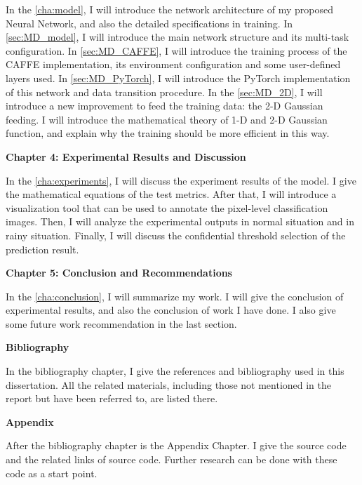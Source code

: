 \begin{spacing}{1.5}
In the \autoref{cha:model}, I will introduce the network architecture of my proposed Neural Network, and also the detailed specifications in training. In \autoref{sec:MD_model}, I will introduce the main network structure and its multi-task configuration. In \autoref{sec:MD_CAFFE}, I will introduce the training process of the CAFFE implementation, its environment configuration and some user-defined layers used. In \autoref{sec:MD_PyTorch}, I will introduce the PyTorch implementation of this network and data transition procedure. In the \autoref{sec:MD_2D}, I will introduce a new improvement to feed the training data: the 2-D Gaussian feeding. I will introduce the mathematical theory of 1-D and 2-D Gaussian function, and explain why the training should be more  efficient in this way.

{\large\textbf{Chapter 4: Experimental Results and Discussion}}

In the \autoref{cha:experiments}, I will discuss the experiment results of the model. I give the mathematical equations of the test metrics. After that, I will introduce a visualization tool that can be used to annotate the pixel-level classification images. Then, I will analyze the experimental outputs in normal situation and in rainy situation. Finally, I will discuss the confidential threshold selection of the prediction result.

{\large\textbf{Chapter 5: Conclusion and Recommendations}}

In the \autoref{cha:conclusion}, I will summarize my work. I will give the conclusion of experimental results, and also the conclusion of work I have done. I also give some future work recommendation in the last section.

{\large\textbf{Bibliography}}

In the bibliography chapter, I give the references and bibliography used in this dissertation. All the related materials, including those not mentioned in the report but have been referred to, are listed there.

{\large\textbf{Appendix}}

After the bibliography chapter is the Appendix Chapter. I give the source code and the related links of source code. Further research can be done with these code as a start point.

\end{spacing}
\newpage


